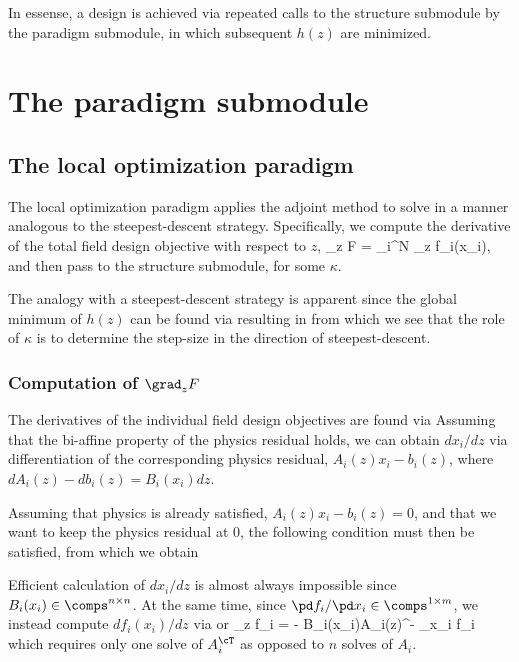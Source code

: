 \documentclass{book}
\begin{document}
In essense, a design is achieved via repeated calls to the structure submodule
    by the paradigm submodule,
    in which subsequent $h(z)$ are minimized.

\section{The paradigm submodule}
\subsection{The local optimization paradigm}
The local optimization paradigm applies the adjoint method to solve 
    in a manner analogous to the steepest-descent strategy.
Specifically, we compute the derivative of the total field design objective with respect to $z$,
        {\grad_z F = \sum_i^N \grad_z f_i(x_i),}
    and then pass 
    to the structure submodule, for some $\kappa$.

The analogy with a steepest-descent strategy is apparent since 
    the global minimum of $h(z)$ can be found via
    resulting in 
    from which we see that the role of $\kappa$ is to determine the step-size 
    in the direction of steepest-descent.

\subsubsection{Computation of $\grad_z F$}
The derivatives of the individual field design objectives are found via
Assuming that the bi-affine property of the physics residual holds,
    we can obtain ${dx_i}/{dz}$ 
    via differentiation of the corresponding physics residual, 
    $A_i(z) x_i - b_i(z)$,
    where $dA_i(z) - db_i(z) = B_i(x_i)dz$.

Assuming that physics is already satisfied, $A_i(z) x_i - b_i(z) = 0$,
    and that we want to keep the physics residual at 0,
    the following condition must then be satisfied,
    from which we obtain

Efficient calculation of $dx_i/dz$ is almost always impossible since $B_i(x_i) \in \comps^{n \times n}$.
At the same time, since ${\pd f_i}/{\pd x_i} \in \comps^{1 \times m}$, we instead compute $df_i(x_i)/dz$ via
    or
        {\grad_z f_i =  - B_i(x_i)\T A_i(z)^{-\cT} \grad_{x_i} f_i}
    which requires only one solve of $A_i^\cT$ as opposed to $n$ solves of $A_i$.
\end{document}
